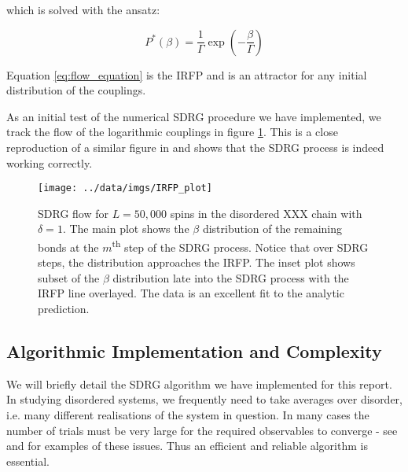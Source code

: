 which is solved with the ansatz:

\begin{equation}
P^{*}(\beta)=\frac{1}{\Gamma} \exp \left(-\frac{\beta}{\Gamma}\right)
\end{equation}

Equation \ref{eq:flow_equation} is the IRFP and is an attractor for any initial distribution of the couplings.

As an initial test of the numerical SDRG procedure we have implemented, we track the flow of the logarithmic couplings in figure \ref{fig:irfp_flow}. This is a close reproduction of a similar figure in \cite{paola2016} and shows that the SDRG process is indeed working correctly.

\begin{figure}[h]
    \centering
    \texttt{[image: ../data/imgs/IRFP\_plot]}
    \caption{SDRG flow for $L = 50,000$ spins in the disordered XXX chain with $\delta = 1$. The main plot shows the $\beta$ distribution of the remaining bonds at the $m$\textsuperscript{th} step of the SDRG process. Notice that over SDRG steps, the distribution approaches the IRFP. The inset plot shows subset of the $\beta$ distribution late into the SDRG process with the IRFP line overlayed. The data is an excellent fit to the analytic prediction.}
    \label{fig:irfp_flow}
\end{figure}


\subsection{Algorithmic Implementation and Complexity}\label{sec:algorithm}
We will briefly detail the SDRG algorithm we have implemented for this report. In studying disordered systems, we frequently need to take averages over disorder, i.e. many different realisations of the system in question. In many cases the number of trials must be very large for the required observables to converge - see \cite{paola_22} and \cite{paola2016} for examples of these issues. Thus an efficient and reliable algorithm is essential. 

